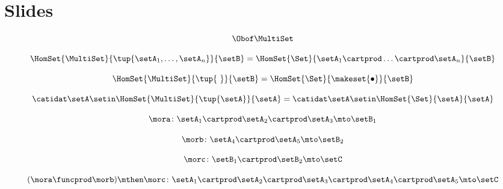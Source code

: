 
\section{Slides}
\label{sec:multicategories-slides}

\begin{forslides}

    \begin{equation}
        \label{eq:slides_multicategories_00}
        \Obof\MultiSet
    \end{equation}

    \begin{equation}
        \label{eq:slides_multicategories_01}
        \HomSet{\MultiSet}{\tup{\setA_1,\ldots,\setA_n}}{\setB}=\HomSet{\Set}{\setA_1 \cartprod \ldots \cartprod \setA_n}{\setB}
    \end{equation}

    \begin{equation}
        \label{eq:slides_multicategories_02}
        \HomSet{\MultiSet}{\tup{ \ }}{\setB}=\HomSet{\Set}{\makeset{ \bullet }}{\setB}
    \end{equation}

    \begin{equation}
        \label{eq:slides_multicategories_03}
        \catidat\setA \setin \HomSet{\MultiSet}{\tup{\setA}}{\setA}=\catidat\setA \setin \HomSet{\Set}{\setA}{\setA}
    \end{equation}

    \begin{equation}
        \label{eq:slides_multicategories_04}
        \mora \colon \setA_1 \cartprod \setA_2 \cartprod \setA_3 \mto \setB_1
    \end{equation}

    \begin{equation}
        \label{eq:slides_multicategories_05}
        \morb \colon \setA_4 \cartprod \setA_5 \mto \setB_2
    \end{equation}

    \begin{equation}
        \label{eq:slides_multicategories_06}
        \morc \colon \setB_1 \cartprod \setB_2 \mto \setC
    \end{equation}

    \begin{equation}
        \label{eq:slides_multicategories_07}
        (\mora \funcprod \morb) \mthen \morc \colon \setA_1 \cartprod \setA_2 \cartprod \setA_3 \cartprod \setA_4 \cartprod \setA_5 \mto \setC
    \end{equation}


\end{forslides}
